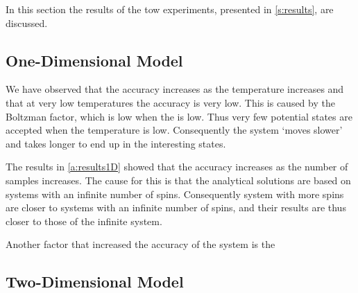 In this section the results of the tow experiments, presented in \cref{s:results}, are discussed.

\subsection{One-Dimensional Model}
	
	We have observed that the accuracy increases as the temperature increases and that at very low temperatures the accuracy is very low. This is caused by the Boltzman factor, which is low when the \temperature is low. Thus very few potential states are accepted when the temperature is low. Consequently the system `moves slower' and takes longer to end up in the interesting states.
	
	The results in \cref{a:results1D} showed that the accuracy increases as the number of samples increases. The cause for this is that the analytical solutions are based on systems with an infinite number of spins. Consequently system with more spins are closer to systems with an infinite number of spins, and their results are thus closer to those of the infinite system. 

	Another factor that increased the accuracy of the system is the 


	
	



\subsection{Two-Dimensional Model}


